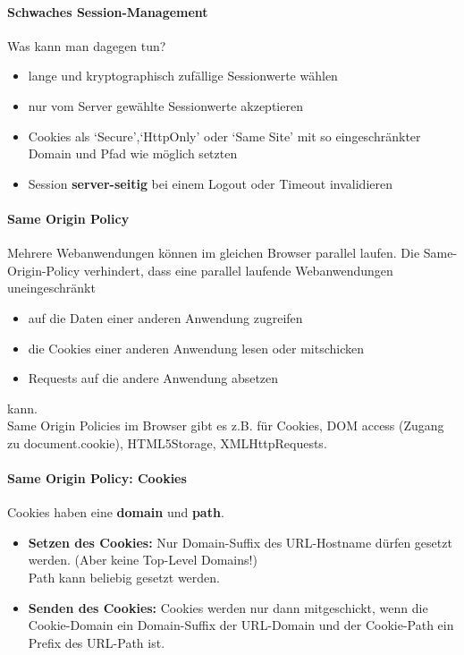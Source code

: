 \documentclass[10pt,a4paper]{article}
\begin{document}
\paragraph*{Schwaches Session-Management}Was kann man dagegen tun?
\begin{itemize}[noitemsep,topsep=0pt,leftmargin=*]
    \item lange und kryptographisch zufällige Sessionwerte wählen
    \item nur vom Server gewählte Sessionwerte akzeptieren
    \item Cookies als `Secure',`HttpOnly' oder `Same Site' mit so eingeschränkter Domain und Pfad wie möglich setzten
    \item Session \textbf{server-seitig} bei einem Logout oder Timeout invalidieren
\end{itemize}

\paragraph*{Same Origin Policy}Mehrere Webanwendungen können im gleichen Browser parallel laufen. Die Same-Origin-Policy verhindert, dass eine parallel laufende Webanwendungen uneingeschränkt
\begin{itemize}[noitemsep,topsep=0pt,leftmargin=*]
    \item auf die Daten einer anderen Anwendung zugreifen
    \item die Cookies einer anderen Anwendung lesen oder mitschicken
    \item Requests auf die andere Anwendung absetzen
\end{itemize} kann.\\
Same Origin Policies im Browser gibt es z.B. für Cookies, DOM access (Zugang zu document.cookie), HTML5Storage, XMLHttpRequests.

\paragraph*{Same Origin Policy: Cookies} Cookies haben eine \textbf{domain} und \textbf{path}.
\begin{itemize}[noitemsep,topsep=0pt,leftmargin=*]
    \item \textbf{Setzen des Cookies:} Nur Domain-Suffix des URL-Hostname dürfen gesetzt werden. (Aber keine Top-Level Domains!)\\
    Path kann beliebig gesetzt werden.
    \item \textbf{Senden des Cookies:} Cookies werden nur dann mitgeschickt, wenn die Cookie-Domain ein Domain-Suffix der URL-Domain und der Cookie-Path ein Prefix des URL-Path ist.
\end{itemize}
\end{document}

